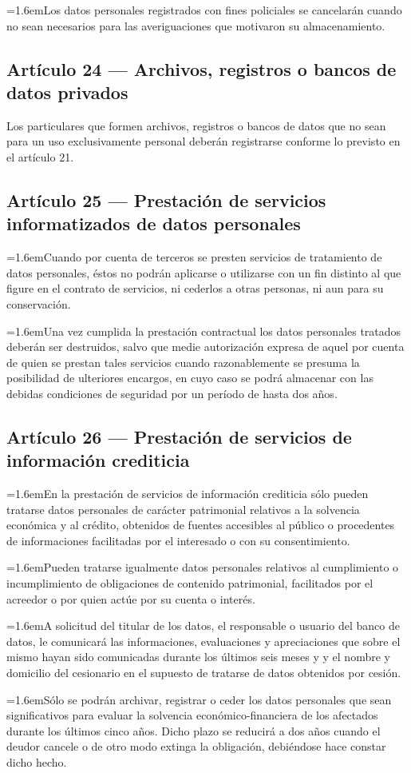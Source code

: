 \documentclass[10pt,a4paper]{article}
\newcommand{\articulo}[1]{\subsection{#1}}
\newcommand{\inciso}[2]{\par{\hangindent=1.6em\hangafter=1\makebox[1.6em][l]{#1}#2\par}}
\begin{document}
\inciso{3.}{Los datos personales registrados con fines policiales se cancelarán cuando no sean necesarios para las averiguaciones que motivaron su almacenamiento.}

\articulo{Artículo 24 --- Archivos, registros o bancos de datos privados}
Los particulares que formen archivos, registros o bancos de datos que no sean para un uso exclusivamente personal deberán registrarse conforme lo previsto en el artículo 21.

\articulo{Artículo 25 --- Prestación de servicios informatizados de datos personales}
\inciso{1.}{Cuando por cuenta de terceros se presten servicios de tratamiento de datos personales, éstos no podrán aplicarse o utilizarse con un fin distinto al que figure en el contrato de servicios, ni cederlos a otras personas, ni aun para su conservación.}

\inciso{2.}{Una vez cumplida la prestación contractual los datos personales tratados deberán ser destruidos, salvo que medie autorización expresa de aquel por cuenta de quien se prestan tales servicios cuando razonablemente se presuma la posibilidad de ulteriores encargos, en cuyo caso se podrá almacenar con las debidas condiciones de seguridad por un período de hasta dos años.}

\articulo{Artículo 26 --- Prestación de servicios de información crediticia}
\inciso{1.}{En la prestación de servicios de información crediticia sólo pueden tratarse datos personales de carácter patrimonial relativos a la solvencia económica y al crédito, obtenidos de fuentes accesibles al público o procedentes de informaciones facilitadas por el interesado o con su consentimiento.}

\inciso{2.}{Pueden tratarse igualmente datos personales relativos al cumplimiento o incumplimiento de obligaciones de contenido patrimonial, facilitados por el acreedor o por quien actúe por su cuenta o interés.}

\inciso{3.}{A solicitud del titular de los datos, el responsable o usuario del banco de datos, le comunicará las informaciones, evaluaciones y apreciaciones que sobre el mismo hayan sido comunicadas durante los últimos seis meses y y el nombre y domicilio del cesionario en el supuesto de tratarse de datos obtenidos por cesión.}

\inciso{4.}{Sólo se podrán archivar, registrar o ceder los datos personales que sean significativos para evaluar la solvencia económico-financiera de los afectados durante los últimos cinco años. Dicho plazo se reducirá a dos años cuando el deudor cancele o de otro modo extinga la obligación, debiéndose hace constar dicho hecho.}
\end{document}
